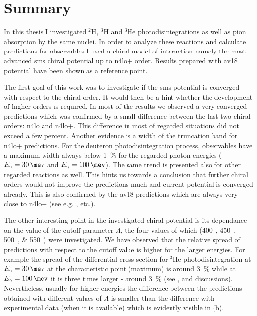 \chapter{Summary}

In this thesis I investigated $^2$H, $^3$H and $^3$He photodisintegrations
as well as pion absorption by the same nuclei. In order to analyze these reactions
and calculate predictions for observables I used a chiral model of interaction
namely the most advanced \gls{sms} chiral potential up to \gls{n4lo+} order.
Results prepared with \gls{av18} potential have been shown as 
a reference point.

The first goal of this work was to investigate if the \gls{sms}
potential is converged with respect to the chiral order. It would then be
a hint whether the development of higher orders is required. In most of the results
we observed a very converged predictions which was confirmed by a small difference
between the last two chiral orders: \gls{n4lo} and \gls{n4lo+}. This
difference in most of regarded situations did not exceed a few percent.
Another evidence is a width of the truncation band for \gls{n4lo+} predictions.
For the deuteron photodisintegration process, observables have a maximum
width always below \SI{1}{\percent} for the regarded photon energies
($E_\gamma=\SI{30}{\mev}$ and $E_\gamma=\SI{100}{\mev}$).
The same trend is presented also for other regarded reactions as well.
This hints us towards a conclusion that further chiral orders would not
improve the predictions much and current potential is converged already.
This is also confirmed by the \gls{av18} predictions which are
always very close to \gls{n4lo+} (see e.g. ,  etc.).

The other interesting point in the investigated chiral potential is its dependance
on the value of the cutoff parameter $\Lambda$, the four values of which (\SIlist[list-units = single]{400;450;500;550}{\mev}) 
were investigated. We have observed that the relative spread of predictions 
with respect to the cutoff value is higher for the larger energies.
For example the spread of the differential cross section for $^3$He photodisintegration
at $E_\gamma=\SI{30}{\mev}$ at the characteristic point (maximum) is around \SI{3}{\percent}
while at $E_\gamma=\SI{100}{\mev}$ it is three times larger - around \SI{3}{\percent}
(see ,  and discussions).
Nevertheless, usually for higher energies the difference between the predictions
obtained with different values of $\Lambda$ is smaller than the difference with experimental
data (when it is available) which is evidently visible in (b).

